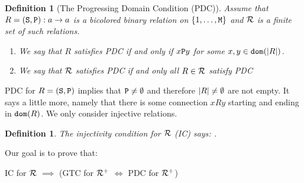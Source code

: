 \documentclass{lmcs}
\newtheorem{definition}[theorem]{Definition}
\begin{document}
\begin{definition}[The Progressing Domain Condition (PDC)]
\label{definition-Progressing-Domain-Condition-PDC}
Assume that $R = ({\tt S},{\tt P}) : a \rightarrow a$ is a bicolored binary relation on 
$\{1, \ldots,{\tt M}\}$ and ${\mathcal R}$ is a finite set of such relations.
\begin{enumerate}
\item
We say that $R$ satisfies PDC if and only if $x {\tt P} y$ for some 
$x, y \in {\tt dom}({| R |})$.
\item
We say that ${\mathcal R}$ satisfies PDC if and only all $R \in {\mathcal R}$ satisfy PDC
\end{enumerate}
\end{definition}

PDC for  $R=({\tt S},{\tt P})$ implies that ${\tt P} \not = \emptyset$ and therefore ${| R |} \not = \emptyset $ are not empty. It says a little more, namely that there is some connection $x R y$ starting and ending in ${\tt dom}(R)$. We only consider injective relations.
\\

\begin{definition}
\label{definition-injectivity-condition-IC}
\emph{The injectivity condition for ${\mathcal R}$} (IC) says: 
 . 
\end{definition}

Our goal is to prove that:

\begin{center}
IC for ${\mathcal R}$ $\implies$ 
(GTC for ${\mathcal R}^+$ $\Leftrightarrow$ PDC  for ${\mathcal R}^+$)
\end{center}
\end{document}
